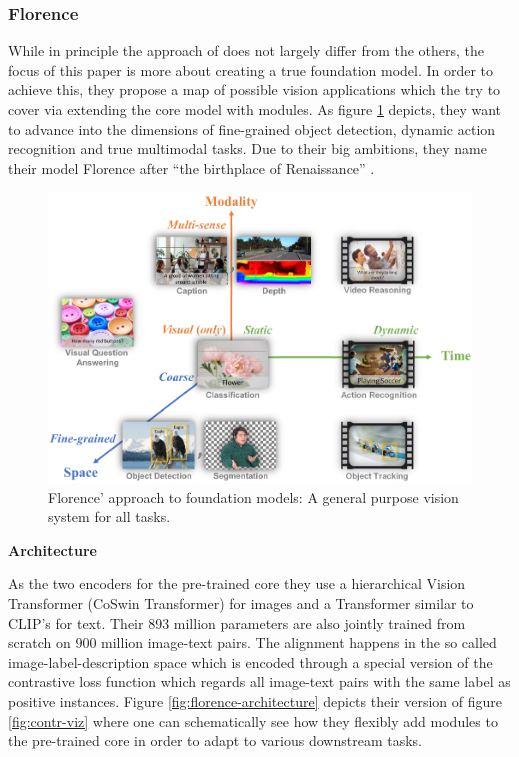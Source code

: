 \documentclass[
]{krantz}
\begin{document}
\hypertarget{florence}{%
\subsubsection{Florence}\label{florence}}

While in principle the approach of \citet{yuan2021florence} does not largely differ from the others, the focus of this paper is more about creating a true foundation model.
In order to achieve this, they propose a map of possible vision applications which the try to cover via extending the core model with modules.
As figure \ref{fig:florence-dimensions} depicts, they want to advance into the dimensions of fine-grained object detection, dynamic action recognition and true multimodal tasks.
Due to their big ambitions, they name their model Florence after ``the birthplace of Renaissance'' \citep{yuan2021florence}.

\begin{figure}

{\centering \includegraphics[width=1\linewidth]{figures/02-04-text-support-img/florence-dimensions} 

}

\caption{Florence' approach to foundation models: A general purpose vision system for all tasks.}\label{fig:florence-dimensions}
\end{figure}



\textbf{Architecture}

As the two encoders for the pre-trained core they use a hierarchical Vision Transformer (CoSwin Transformer) for images and a Transformer similar to CLIP's for text.
Their 893 million parameters are also jointly trained from scratch on 900 million image-text pairs.
The alignment happens in the so called image-label-description space which is encoded through a special version of the contrastive loss function which regards all image-text pairs with the same label as positive instances.
Figure \ref{fig:florence-architecture} depicts their version of figure \ref{fig:contr-viz} where one can schematically see how they flexibly add modules to the pre-trained core in order to adapt to various downstream tasks.
\end{document}
